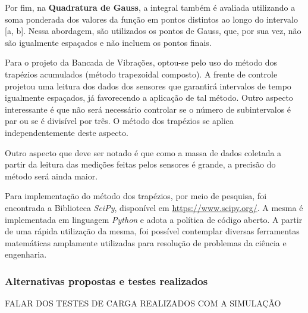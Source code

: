 Por fim, na \textbf{Quadratura de Gauss}, a integral também é avaliada utilizando a soma ponderada dos valores da função em pontos distintos 
ao longo do intervalo [a, b]. Nessa abordagem, são utilizados os pontos de Gauss, que, por sua vez, não são igualmente espaçados e não incluem 
os pontos finais.

Para o projeto da Bancada de Vibrações, optou-se pelo uso do método dos trapézios acumulados (método trapezoidal composto). A frente de 
controle projetou uma leitura dos dados dos sensores que garantirá intervalos de tempo igualmente espaçados, já favorecendo a aplicação de 
tal método. Outro aspecto interessante é que não será necessário controlar se o número de subintervalos é par ou se é divisível por três. 
O método dos trapézios se aplica independentemente deste aspecto.

Outro aspecto que deve ser notado é que como a massa de dados coletada a partir da leitura das medições feitas pelos sensores é grande, a
precisão do método será ainda maior.

Para implementação do método dos trapézios, por meio de pesquisa, foi encontrada a Biblioteca \textit{SciPy}, disponível em \href{https://www.scipy.org/}{https://www.scipy.org/}. A mesma é implementada em linguagem \textit{Python} e adota a política de código aberto. A partir de uma rápida utilização da mesma, foi possível contemplar diversas ferramentas matemáticas amplamente utilizadas para resolução de problemas da ciência e engenharia.


\subsubsection{\textbf{Alternativas propostas e testes realizados}}


FALAR DOS TESTES DE CARGA REALIZADOS COM A SIMULAÇÃO
